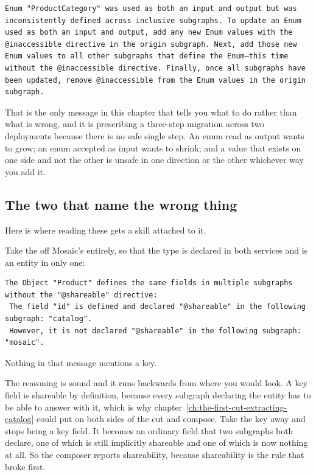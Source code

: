 \begin{verbatim}
Enum "ProductCategory" was used as both an input and output but was inconsistently defined across inclusive subgraphs. To update an Enum used as both an input and output, add any new Enum values with the @inaccessible directive in the origin subgraph. Next, add those new Enum values to all other subgraphs that define the Enum—this time without the @inaccessible directive. Finally, once all subgraphs have been updated, remove @inaccessible from the Enum values in the origin subgraph.
\end{verbatim}

%
That is the only message in this chapter that tells you what to do rather than
what is wrong, and it is prescribing a three-step migration across two
deployments because there is no safe single step. An enum read as output wants
to grow; an enum accepted as input wants to shrink; and a value that exists on
one side and not the other is unsafe in one direction or the other whichever way
you add it.

\subsection*{The two that name the wrong thing}

%
Here is where reading these gets a skill attached to it.

Take the  off Mosaic's  entirely, so that the type is
declared in both services and is an entity in only one:

\begin{verbatim}
The Object "Product" defines the same fields in multiple subgraphs without the "@shareable" directive:
 The field "id" is defined and declared "@shareable" in the following subgraph: "catalog".
 However, it is not declared "@shareable" in the following subgraph: "mosaic".
\end{verbatim}

Nothing in that message mentions a key.

%
The reasoning is sound and it runs backwards from where you would look. A key
field is shareable by definition, because every subgraph declaring the entity
has to be able to answer with it, which is why
chapter~\ref{ch:the-first-cut-extracting-catalog} could put  on both
sides of the cut and compose. Take the key away and  stops being a key
field. It becomes an ordinary field that two subgraphs both declare, one of
which is still implicitly shareable and one of which is now nothing at all. So
the composer reports shareability, because shareability is the rule that broke
first.

